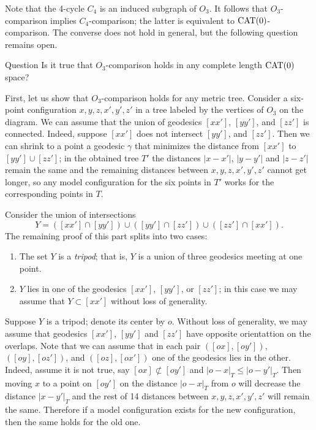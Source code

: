 \documentclass{article}
\begin{document}
Note that the 4-cycle $C_4$ is an induced subgraph of $O_3$.
It follows that $O_3$-comparison implies $C_4$-comparison;
the latter is equivalent to $\mathrm{CAT}(0)$-comparison.
The converse does not hold in general, but the following question remains open.

\begin{thm}{Question}
Is it true that $O_3$-comparison holds in any complete length $\mathrm{CAT}(0)$ space?
\end{thm}

First, let us show that $O_3$-comparison holds for any metric tree.
Consider a six-point configuration $x,y,z,x',y',z'$ in a tree labeled by the vertices of $O_3$ on the diagram.
We can assume that the union of geodesics $[xx']$, $[yy']$, and $[zz']$ is connected.
Indeed, suppose $[xx']$ does not intersect $[yy']$, and $[zz']$.
Then we can shrink to a point a geodesic $\gamma$ that minimizes the distance from $[xx']$ to $[yy']\cup[zz']$;
in the obtained tree $T'$ the distances $|x-x'|$, $|y-y'|$ and $|z-z'|$ remain the same and the remaining distances between $x,y,z,x',y',z'$ cannot get longer, so any model configuration for the six points in $T'$ works for the corresponding points in $T$.

Consider the union of intersections 
\[Y=([xx']\cap [yy'])\cup([yy']\cap [zz'])\cup([zz']\cap [xx']).\]
The remaining proof of this part splits into two cases:
\begin{enumerate}
\item The set $Y$ is a \emph{tripod}; that is, $Y$ is a union of three geodesics meeting at one point. 
\item $Y$ lies in one of the  geodesics $[xx']$, $[yy']$, or $[zz']$; in this case we may assume that $Y\subset [xx']$ without loss of generality.
\end{enumerate}

Suppose $Y$ is a tripod; denote its center by $o$.
Without loss of generality, we may assume that geodesics $[xx']$, $[yy']$ and $[zz']$ have opposite orientattion on the overlaps.
Note that we can assume that in each pair $([ox],[oy'])$, $([oy],[oz'])$, and $([oz],[ox'])$ one of the geodesics lies in the other.
Indeed, assume it is not true, say $[ox]\not\subset[oy']$ and $|o-x|_T\le |o-y'|_T$.
Then moving $x$ to a point on $[oy']$ on the distance $|o-x|_T$ from $o$ will decrease the distance $|x-y'|_T$ and the rest of 14 distances between $x,y,z,x',y',z'$ will remain the same.
Therefore if a model configuration exists for the new configuration, then the same holds for the old one. 
\end{document}
